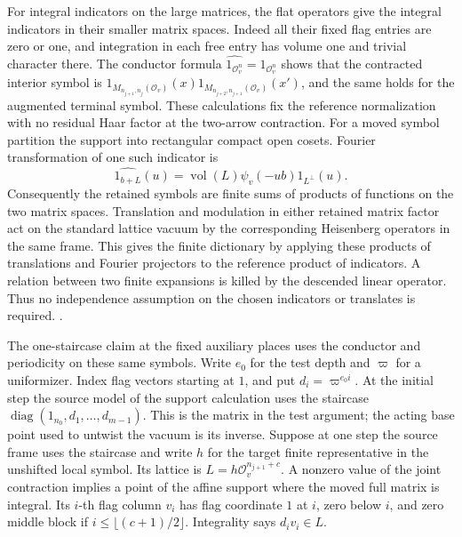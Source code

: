 For integral indicators on the large matrices, the flat
operators give the integral indicators in their smaller
matrix spaces. Indeed all their fixed flag entries are zero
or one, and integration in each free entry has volume one and
trivial character there. The conductor formula
\(\widehat{1_{\mathcal O_v^n}}=1_{\mathcal O_v^n}\)
shows that the contracted interior symbol is
\(1_{M_{n_{j+1},n_j}(\mathcal O_v)}(x)
  1_{M_{n_{j+2},n_{j+1}}(\mathcal O_v)}(x')\),
and the same holds for the augmented terminal symbol. These
calculations fix the reference normalization with no residual
Haar factor at the two-arrow contraction. For a moved symbol
partition the support into rectangular compact open cosets.
Fourier transformation of one such indicator is
\[
 \widehat{1_{b+L}}(u)
    =\operatorname{vol}(L)\psi_v(-ub)1_{L^\perp}(u).
\]
Consequently the retained symbols are finite sums of products
of functions on the two matrix spaces. Translation and
modulation in either retained matrix factor act on the
standard lattice vacuum by the corresponding Heisenberg
operators in the same frame. This gives the finite dictionary
by applying these products of translations and Fourier
projectors to the reference product of indicators. A relation
between two finite expansions is killed by the descended
linear operator. Thus no independence assumption on the
chosen indicators or translates is required.
.

The one-staircase claim at the fixed auxiliary places uses
the conductor and periodicity on these same symbols. Write
\(e_0\) for the test depth and \(\varpi\) for a uniformizer.
Index flag vectors starting at \(1\), and put
\(d_i=\varpi^{e_0 i}\). At the initial step the source model
of the support calculation uses the staircase
\(\operatorname{diag}(1_{n_0},d_1,\ldots,d_{m-1})\).
This is the matrix in the test argument; the acting
base point used to untwist the vacuum is its inverse.
Suppose at one step the source frame uses the staircase
and write \(h\) for the target finite representative in
the unshifted local symbol. Its lattice is
\(L=h\mathcal O_v^{n_{j+1}+c}\).
A nonzero value of the joint contraction implies a point
of the affine support where the moved full matrix is integral.
Its \(i\)-th flag column \(v_i\) has flag coordinate \(1\)
at \(i\), zero below \(i\), and zero middle block if
\(i\le \lfloor(c+1)/2\rfloor\). Integrality says \(d_i v_i\in L\).

